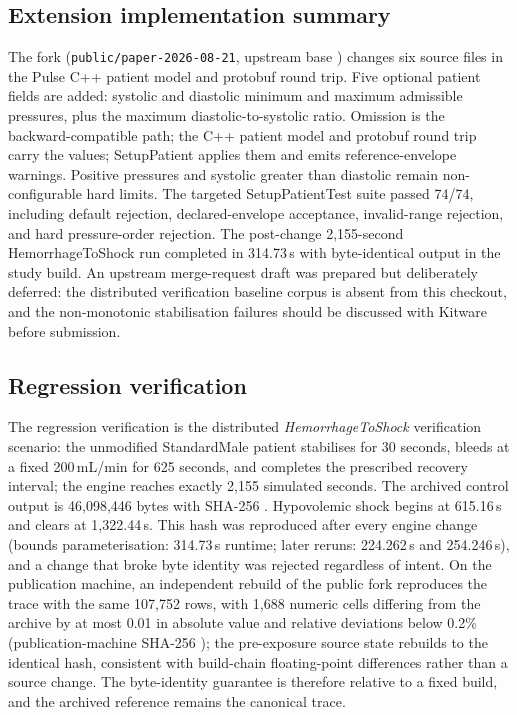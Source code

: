\documentclass[preprint,12pt,nopreprintline]{elsarticle}
\begin{document}
\subsection{Extension implementation summary}

The fork (\texttt{public/paper-2026-08-21}, upstream base {\ttfamily{}}) changes six source files in the Pulse C++ patient model and protobuf round trip. Five optional patient fields are added: systolic and diastolic minimum and maximum admissible pressures, plus the maximum diastolic-to-systolic ratio. Omission is the backward-compatible path; the C++ patient model and protobuf round trip carry the values; SetupPatient applies them and emits reference-envelope warnings. Positive pressures and systolic greater than diastolic remain non-configurable hard limits. The targeted SetupPatientTest suite passed 74/74, including default rejection, declared-envelope acceptance, invalid-range rejection, and hard pressure-order rejection. The post-change 2{,}155-second HemorrhageToShock run completed in 314.73\,s with byte-identical output in the study build. An upstream merge-request draft was prepared but deliberately deferred: the distributed verification baseline corpus is absent from this checkout, and the non-monotonic stabilisation failures should be discussed with Kitware before submission.

\subsection{Regression verification}

The regression verification is the distributed \emph{HemorrhageToShock} verification scenario: the unmodified StandardMale patient stabilises for 30 seconds, bleeds at a fixed 200\,mL/min for 625 seconds, and completes the prescribed recovery interval; the engine reaches exactly 2{,}155 simulated seconds. The archived control output is 46{,}098{,}446 bytes with SHA-256 {\ttfamily{}}. Hypovolemic shock begins at 615.16\,s and clears at 1{,}322.44\,s. This hash was reproduced after every engine change (bounds parameterisation: 314.73\,s runtime; later reruns: 224.262\,s and 254.246\,s), and a change that broke byte identity was rejected regardless of intent. On the publication machine, an independent rebuild of the public fork reproduces the trace with the same 107{,}752 rows, with 1{,}688 numeric cells differing from the archive by at most 0.01 in absolute value and relative deviations below 0.2\% (publication-machine SHA-256 {\ttfamily{}}); the pre-exposure source state rebuilds to the identical hash, consistent with build-chain floating-point differences rather than a source change. The byte-identity guarantee is therefore relative to a fixed build, and the archived reference remains the canonical trace.
\end{document}
